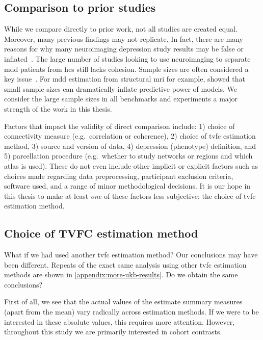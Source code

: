 \subsection{Comparison to prior studies}

While we compare directly to prior work, not all studies are created equal.
Moreover, many previous findings may not replicate.
In fact, there are many reasons for why many neuroimaging depression study results may be false or inflated~\parencite{Flint2021}.
The large number of studies looking to use neuroimaging to separate \gls{mdd} patients from \glspl{hc} still lacks cohesion.
Sample sizes are often considered a key issue~\parencite{Varoquaux2018, Szucs2020, Libedinsky2022, Marek2022}.
For \gls{mdd} estimation from structural \gls{mri} for example, \textcite{Flint2021} showed that small sample sizes can dramatically inflate predictive power of models.
We consider the large sample sizes in all benchmarks and experiments a major strength of the work in this thesis.

Factors that impact the validity of direct comparison include: 1) choice of connectivity measure (e.g.~correlation or coherence), 2) choice of \gls{tvfc} estimation method, 3) source and version of data, 4) depression (phenotype) definition, and 5) parcellation procedure (e.g.~whether to study networks or regions and which atlas is used).
These do not even include other implicit or explicit factors such as choices made regarding data preprocessing, participant exclusion criteria, software used, and a range of minor methodological decisions.
It is our hope in this thesis to make at least \emph{one} of these factors less subjective: the choice of \gls{tvfc} estimation method.

\subsection{Choice of TVFC estimation method}

What if we had used another \gls{tvfc} estimation method?
Our conclusions may have been different.
Repeats of the exact same analysis using other \gls{tvfc} estimation methods are shown in \cref{appendix:more-ukb-results}.
Do we obtain the same conclusions?

First of all, we see that the actual values of the estimate summary measures (apart from the mean) vary radically across estimation methods.
If we were to be interested in these absolute values, this requires more attention.
However, throughout this study we are primarily interested in cohort contrasts.

